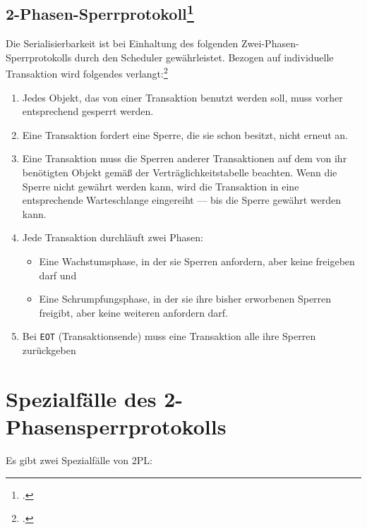 \documentclass{lehramt-informatik-haupt}
\begin{document}
%

\subsection{2-Phasen-Sperrprotokoll\footcite[Seite 16]{db:fs:5}}

Die Serialisierbarkeit ist bei Einhaltung des folgenden
Zwei-Phasen-Sperrprotokolls durch den Scheduler gewährleistet. Bezogen
auf individuelle Transaktion wird folgendes verlangt:\footcite{wiki:sperrverfahren}

\begin{enumerate}
\item Jedes Objekt, das von einer Transaktion benutzt werden soll, muss
vorher entsprechend gesperrt werden.

\item Eine Transaktion fordert eine Sperre, die sie schon besitzt, nicht
erneut an.

\item Eine Transaktion muss die Sperren anderer Transaktionen auf dem
von ihr benötigten Objekt gemäß der Verträglichkeitstabelle beachten.
Wenn die Sperre nicht gewährt werden kann, wird die Transaktion in eine
entsprechende Warteschlange eingereiht — bis die Sperre gewährt werden
kann.

\item Jede Transaktion durchläuft zwei Phasen:

\begin{itemize}
\item Eine Wachstumsphase, in der sie Sperren anfordern, aber keine
freigeben darf und

\item Eine Schrumpfungsphase, in der sie ihre bisher erworbenen
Sperren freigibt, aber keine weiteren anfordern darf.
\end{itemize}

\item Bei \texttt{EOT} (Transaktionsende) muss eine Transaktion alle
ihre Sperren zurückgeben
\end{enumerate}

\section{Spezialfälle des 2-Phasensperrprotokolls}

Es gibt zwei Spezialfälle von 2PL:
\end{document}
